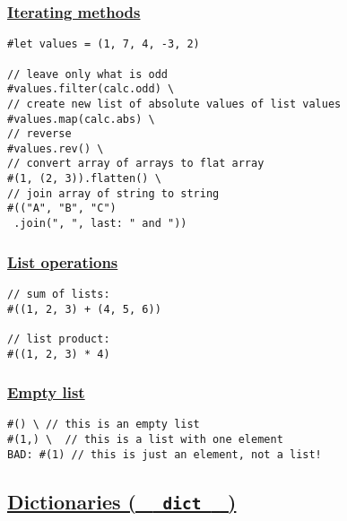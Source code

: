\subsubsection{\texorpdfstring{\hyperref[iterating-methods]{Iterating
methods}}{Iterating methods}}\label{iterating-methods}

\begin{verbatim}
#let values = (1, 7, 4, -3, 2)

// leave only what is odd
#values.filter(calc.odd) \
// create new list of absolute values of list values
#values.map(calc.abs) \
// reverse
#values.rev() \
// convert array of arrays to flat array
#(1, (2, 3)).flatten() \
// join array of string to string
#(("A", "B", "C")
 .join(", ", last: " and "))
\end{verbatim}

\pandocbounded{}

\subsubsection{\texorpdfstring{\hyperref[list-operations]{List
operations}}{List operations}}\label{list-operations}

\begin{verbatim}
// sum of lists:
#((1, 2, 3) + (4, 5, 6))

// list product:
#((1, 2, 3) * 4)
\end{verbatim}

\pandocbounded{}

\subsubsection{\texorpdfstring{\hyperref[empty-list]{Empty
list}}{Empty list}}\label{empty-list}

\begin{verbatim}
#() \ // this is an empty list
#(1,) \  // this is a list with one element
BAD: #(1) // this is just an element, not a list!
\end{verbatim}

\pandocbounded{}

\subsection{\texorpdfstring{\hyperref[dictionaries-dict]{Dictionaries (
\texttt{\ }{\texttt{\ dict\ }}\texttt{\ }
)}}{Dictionaries (   dict   )}}\label{dictionaries-dict}

